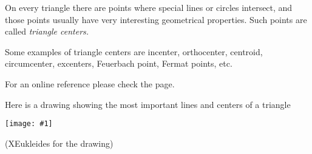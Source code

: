 \documentclass[12pt]{article}
\newcommand{\figuraex}[2]{\begin{center}\texttt{[image: \#1]}\end{center}}
\begin{document}
On every triangle there are points where special lines or circles intersect, and those points usually have very interesting geometrical properties. Such points are called \emph{triangle centers.}

Some examples of triangle centers are incenter, orthocenter, centroid, circumcenter, excenters, Feuerbach point, Fermat points, etc.

For an online reference please check the
 page.

Here is a drawing showing the most important lines and centers of a triangle
\begin{center}
\figuraex{triangulo-rev}{scale=0.75}
\end{center}
{\footnotesize(XEukleides  for the drawing)}
\end{document}
